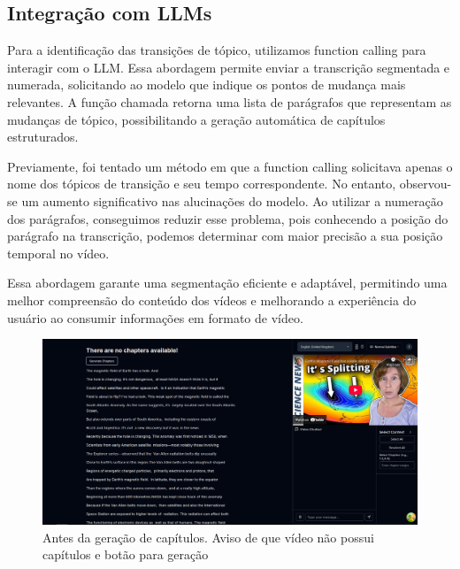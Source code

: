 \documentclass[tcc,capa]{texufpel}
\begin{document}
\subsection{Integra\c{c}\~{a}o com LLMs}

Para a identifica\c{c}\~{a}o das transi\c{c}\~{o}es de t\'opico, utilizamos function calling para interagir com o LLM. Essa abordagem permite enviar a transcri\c{c}\~{a}o segmentada e numerada, solicitando ao modelo que indique os pontos de mudan\c{c}a mais relevantes. A fun\c{c}\~{a}o chamada retorna uma lista de par\'{a}grafos que representam as mudan\c{c}as de t\'opico, possibilitando a gera\c{c}\~{a}o autom\'atica de cap\'{i}tulos estruturados.

Previamente, foi tentado um m\'etodo em que a function calling solicitava apenas o nome dos t\'opicos de transi\c{c}\~{a}o e seu tempo correspondente. No entanto, observou-se um aumento significativo nas alucina\c{c}\~{o}es do modelo. Ao utilizar a numera\c{c}\~{a}o dos par\'{a}grafos, conseguimos reduzir esse problema, pois conhecendo a posi\c{c}\~{a}o do par\'{a}grafo na transcri\c{c}\~{a}o, podemos determinar com maior precis\~{a}o a sua posi\c{c}\~{a}o temporal no v\'{i}deo.

Essa abordagem garante uma segmenta\c{c}\~{a}o eficiente e adapt\'avel, permitindo uma melhor compreens\~{a}o do conte\'udo dos v\'{i}deos e melhorando a experi\^{e}ncia do usu\'ario ao consumir informa\c{c}\~{o}es em formato de v\'{i}deo.



\begin{figure}[H]
  \centering
  \includegraphics[width=\textwidth,height=0.45\textheight,keepaspectratio]{exemplo-slides/graphics/images/generate-chapters.png}
  \caption{Antes da geração de capítulos. Aviso de que vídeo não possui capítulos e botão para geração}
  \label{fig:Average_encryption_throughput}
\end{figure}
\end{document}
